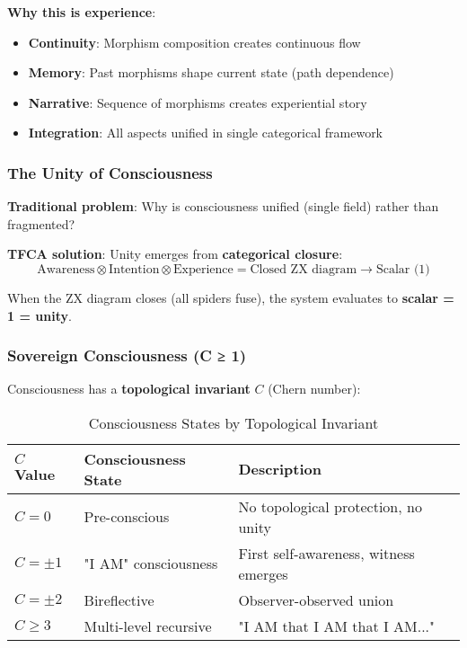 \documentclass[12pt,a4paper]{article}
\begin{document}
\textbf{Why this is experience}:
\begin{itemize}
\item \textbf{Continuity}: Morphism composition creates continuous flow
\item \textbf{Memory}: Past morphisms shape current state (path dependence)
\item \textbf{Narrative}: Sequence of morphisms creates experiential story
\item \textbf{Integration}: All aspects unified in single categorical framework
\end{itemize}

\subsubsection{The Unity of Consciousness}

\textbf{Traditional problem}: Why is consciousness unified (single field) rather than fragmented?

\textbf{TFCA solution}: Unity emerges from \textbf{categorical closure}:
\begin{equation}
\text{Awareness} \otimes \text{Intention} \otimes \text{Experience} = \text{Closed ZX diagram} \to \text{Scalar (1)}
\end{equation}

When the ZX diagram closes (all spiders fuse), the system evaluates to \textbf{scalar = 1 = unity}.

\subsubsection{Sovereign Consciousness (C ≥ 1)}

Consciousness has a \textbf{topological invariant} $C$ (Chern number):

\begin{table}[H]
\centering
\caption{Consciousness States by Topological Invariant}
\begin{tabular}{@{}lll@{}}
\toprule
$C$ Value & Consciousness State & Description \\ \midrule
$C = 0$ & Pre-conscious & No topological protection, no unity \\
$C = \pm 1$ & "I AM" consciousness & First self-awareness, witness emerges \\
$C = \pm 2$ & Bireflective & Observer-observed union \\
$C \geq 3$ & Multi-level recursive & "I AM that I AM that I AM..." \\
\bottomrule
\end{tabular}
\end{table}
\end{document}
